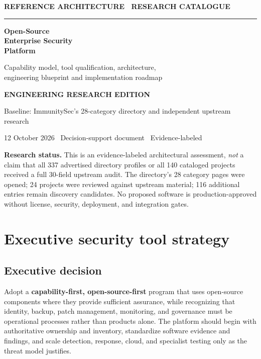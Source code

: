 \documentclass[11pt,oneside]{report}
\newcommand{\term}[1]{\textsf{\textbf{#1}}}
\begin{document}
\begin{titlepage}
\pagecolor{navy}\color{white}
\vspace*{1.05in}
{\sffamily\bfseries\fontsize{12}{15}\selectfont REFERENCE ARCHITECTURE \textbullet\ RESEARCH CATALOGUE}\par
\vspace{0.18in}
{\color{gold}\rule{0.82\textwidth}{2.5pt}}\par
\vspace{0.48in}
{\sffamily\bfseries\fontsize{35}{41}\selectfont Open-Source\\Enterprise Security\\Platform}\par
\vspace{0.27in}
{\sffamily\fontsize{17}{23}\selectfont Capability model, tool qualification, architecture,\\engineering blueprint and implementation roadmap}\par
\vfill
{\sffamily\bfseries\large ENGINEERING RESEARCH EDITION}\par
\vspace{0.15in}
{\sffamily\normalsize Baseline: ImmunitySec's 28-category directory and independent upstream research}\par
\vspace{0.23in}
{\sffamily\normalsize 12 October 2026 \textbullet\ Decision-support document \textbullet\ Evidence-labeled}\par
\vspace{0.3in}
\end{titlepage}
\nopagecolor\color{ink}
\begin{insight}
\textbf{Research status.} This is an evidence-labeled architectural assessment, \emph{not} a claim that all 337 advertised directory profiles or all 140 cataloged projects received a full 30-field upstream audit. The directory's 28 category pages were opened; 24 projects were reviewed against upstream material; 116 additional entries remain discovery candidates. No proposed software is production-approved without license, security, deployment, and integration gates.
\end{insight}
\tableofcontents
\clearpage
{}

\chapter{Executive security tool strategy}
\section{Executive decision}
Adopt a \term{capability-first, open-source-first} program that uses open-source components where they provide sufficient assurance, while recognizing that identity, backup, patch management, monitoring, and governance must be operational processes rather than products alone. The platform should begin with authoritative ownership and inventory, standardize software evidence and findings, and scale detection, response, cloud, and specialist testing only as the threat model justifies.
\end{document}
